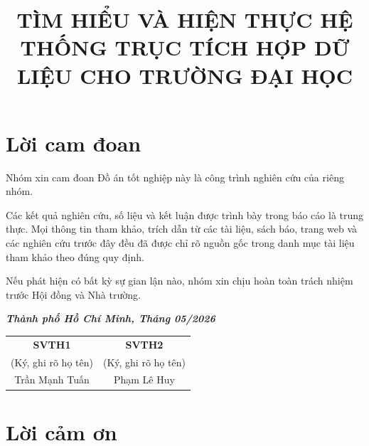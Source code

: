 \documentclass[twoside, final]{hcmut-report}
\title{TÌM HIỂU VÀ HIỆN THỰC HỆ THỐNG TRỤC TÍCH HỢP DỮ LIỆU CHO TRƯỜNG ĐẠI HỌC}
\begin{document}
\coverpage%





\section*{Lời cam đoan}

Nhóm xin cam đoan Đồ án tốt nghiệp này là công trình nghiên cứu của riêng nhóm.

Các kết quả nghiên cứu, số liệu và kết luận được trình bày trong báo cáo là trung thực. Mọi thông tin tham khảo, trích dẫn từ các tài liệu, sách báo, trang web và các nghiên cứu trước đây đều đã được chỉ rõ nguồn gốc trong danh mục tài liệu tham khảo theo đúng quy định.

Nếu phát hiện có bất kỳ sự gian lận nào, nhóm xin chịu hoàn toàn trách nhiệm trước Hội đồng và Nhà trường.

\vspace{2cm}

\noindent
\textbf{\textit{Thành phố Hồ Chí Minh, Tháng 05/2026}}

\vspace{1.5cm}

\begin{center}
  \begin{tabular}{p{} p{}}
  \multicolumn{1}{c}{\textbf{SVTH1}} &
  \multicolumn{1}{c}{\textbf{SVTH2}} \\

  \multicolumn{1}{c}{(Ký, ghi rõ họ tên)} &
  \multicolumn{1}{c}{(Ký, ghi rõ họ tên)} \\[3cm]

  \multicolumn{1}{c}{Trần Mạnh Tuấn} &
  \multicolumn{1}{c}{Phạm Lê Huy}
  \end{tabular}
\end{center}

\newpage

\section*{Lời cảm ơn}
\end{document}
